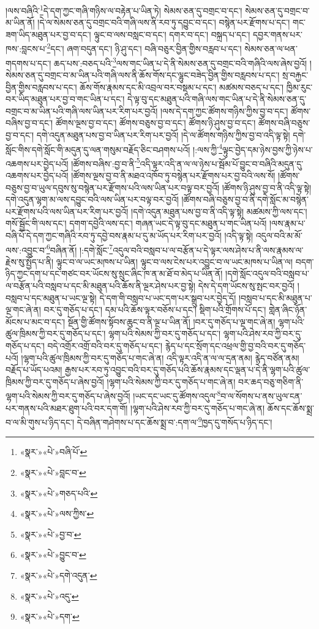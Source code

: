 །ལས་བཞིའི་\footnote{«སྣར་»«པེ་»བཞི་པོ་}དེ་དག་ཀྱང་གཞི་གཉིས་ལ་བརྟེན་པ་ཡིན་ཏེ། སེམས་ཅན་དུ་བགྲང་བ་དང་། སེམས་ཅན་དུ་བགྲང་བ་མ་ཡིན་ནོ། །དེ་ལ་སེམས་ཅན་དུ་བགྲང་བའི་གཞི་ལས་ནི་རབ་ཏུ་དབྱུང་བ་དང་། བསྙེན་པར་རྫོགས་པ་དང་། གང་ཟག་ཡིད་མཐུན་པར་བྱ་བ་དང་། ལྟུང་བ་ལས་བསླང་བ་དང་། དགར་བ་དང་། བསྐྲད་པ་དང་། དབྱར་གནས་པར་ཁས་:བླངས་པ་\footnote{«སྣར་»«པེ་»བླང་བ་}དང་། ཞག་བདུན་དང་། ཉི་ཤུ་དང་། བཞི་བཅུར་བྱིན་གྱིས་བརླབ་པ་དང་། སེམས་ཅན་ལ་ཕན་གདགས་པ་དང་། ཆད་པས་:བཅད་པའི་\footnote{«སྣར་»«པེ་»གཅད་པའི་}ལས་གང་ཡིན་པ་དེ་ནི་སེམས་ཅན་དུ་བགྲང་བའི་གཞིའི་ལས་ཞེས་བྱའོ། །སེམས་ཅན་དུ་བགྲང་བ་མ་ཡིན་པའི་གཞི་ལས་ནི་ཆོས་གོས་དང་ལྷུང་བཟེད་བྱིན་གྱིས་བརླབས་པ་དང་། སྲ་བརྐྱང་བྱིན་གྱིས་བརླབས་པ་དང་། ཆོས་གོས་རྣམས་དང་མི་འབྲལ་བར་བསྡམ་པ་དང་། མཚམས་བཅད་པ་དང་། ཁྱིམ་རུང་བར་ཡིད་མཐུན་པར་བྱ་བ་གང་ཡིན་པ་དང་། དེ་ལྟ་བུ་དང་མཐུན་པའི་གཞི་ལས་གང་ཡིན་པ་དེ་ནི་སེམས་ཅན་དུ་བགྲང་བ་མ་ཡིན་པའི་གཞི་ལས་ཡིན་པར་རིག་པར་བྱའོ། །ལས་དེ་དག་ཀྱང་ཚོགས་གཉིས་ཀྱིས་བྱ་བ་དང་། ཚོགས་བཞིས་བྱ་བ་དང་། ཚོགས་ལྔས་བྱ་བ་དང་། ཚོགས་བཅུས་བྱ་བ་དང་། ཚོགས་ཉི་ཤུས་བྱ་བ་དང་། ཚོགས་བཞི་བཅུས་བྱ་བ་དང་། དགེ་འདུན་མཐུན་པས་བྱ་བ་ཡིན་པར་རིག་པར་བྱའོ། །དེ་ལ་ཚོགས་གཉིས་ཀྱིས་བྱ་བ་འདི་ལྟ་སྟེ། དགེ་སློང་གིས་དགེ་སློང་གི་མདུན་དུ་ལན་གསུམ་བརྗོད་ཅིང་བཤགས་པའོ། །:ལས་ཀྱི་\footnote{«སྣར་»«པེ་»ལས་ཀྱིས་}ལྟུང་བྱེད་དམ་ཉེས་བྱས་ཀྱི་ཉེས་པ་འཆགས་པར་བྱེད་པའོ། །ཚོགས་བཞིས་:བྱ་བ་ནི་\footnote{«སྣར་»«པེ་»བྱ་བ་}འདི་ལྟར་འདི་ན་ལ་ལ་ཉེས་པ་སྦོམ་པོ་བྱུང་བ་བཞིའི་མདུན་དུ་འཆགས་པར་བྱེད་པའོ། །ཚོགས་ལྔས་བྱ་བ་ནི་མཐའ་འཁོབ་ཏུ་བསྙེན་པར་རྫོགས་པར་བྱ་བའི་ལས་སོ། །ཚོགས་བཅུས་བྱ་བ་ཡུལ་དབུས་སུ་བསྙེན་པར་རྫོགས་པའི་ལས་ཡིན་པར་བལྟ་བར་བྱའོ། །ཚོགས་ཉི་ཤུས་བྱ་བ་ནི་འདི་ལྟ་སྟེ། དགེ་འདུན་ལྷག་མ་ལས་དབྱུང་བའི་ལས་ཡིན་པར་བལྟ་བར་བྱའོ། །ཚོགས་བཞི་བཅུས་བྱ་བ་ནི་དགེ་སློང་མ་བསྙེན་པར་རྫོགས་པའི་ལས་ཡིན་པར་རིག་པར་བྱའོ། །དགེ་འདུན་མཐུན་པས་བྱ་བ་ནི་འདི་ལྟ་སྟེ། མཚམས་ཀྱི་ལས་དང་། གསོ་སྦྱོང་གི་ལས་དང་། དགག་དབྱེའི་ལས་དང་། གཞན་ཡང་དེ་ལྟ་བུ་དང་མཐུན་པ་གང་ཡིན་པའོ། །ལས་རྣམ་པ་བཞི་པོ་དེ་དག་ཀྱང་གཞིའི་རབ་ཏུ་དབྱེ་བས་རྣམ་པ་དུ་མ་ཡོད་པར་རིག་པར་བྱའོ། །འདི་ལྟ་སྟེ། འདུལ་བའི་མ་མོ་ལས་:འབྱུང་བ་\footnote{«སྣར་»«པེ་»བྱུང་བ་}བཞིན་ནོ། །:དགེ་སློང་\footnote{«སྣར་»«པེ་»དགེ་འདུན་}འདུལ་བའི་བསླབ་པ་ལ་བརྩོན་པ་དེ་ལྟར་ལས་ཤེས་པ་ནི་ལས་རྣམས་ལ་རྗེས་སུ་སྤྱོད་པ་ནི། ལྟུང་བ་ལ་ཡང་མཁས་པ་ཡིན། ལྟུང་བ་ལས་ངེས་པར་འབྱུང་བ་ལ་ཡང་མཁས་པ་ཡིན་ལ། བདག་ཉིད་ཀྱང་དག་པ་དང་གཙང་བར་ཡོངས་སུ་སྲུང་ཞིང་ཁ་ན་མ་ཐོ་བ་མེད་པ་ཡིན་ནོ། །དགེ་སློང་འདུལ་བའི་བསླབ་པ་ལ་བརྩོན་པའི་བསླབ་པ་དང་མི་མཐུན་པའི་ཆོས་ནི་ལྔར་ཤེས་པར་བྱ་སྟེ། དེས་དེ་དག་ཡོངས་སུ་སྤང་བར་བྱའོ། །བསླབ་པ་དང་མཐུན་པ་ཡང་ལྔ་སྟེ། དེ་དག་གི་བསླབ་པ་ཡང་དག་པར་སྒྲུབ་པར་བྱེད་དོ། །བསླབ་པ་དང་མི་མཐུན་པ་ལྔ་གང་ཞེ་ན། བར་དུ་གཅོད་པ་དང་། དམ་པའི་ཆོས་ལྟར་བཅོས་པ་དང་། སྡིག་པའི་གྲོགས་པོ་དང་། གླེན་ཞིང་ཉོན་མོངས་པ་མང་བ་དང་། སྔོན་གྱི་ཚོགས་སྟོབས་ཆུང་བ་ནི་ལྔ་པ་ཡིན་ནོ། །བར་དུ་གཅོད་པ་ལྔ་གང་ཞེ་ན། ལྷག་པའི་ཚུལ་ཁྲིམས་ཀྱི་བར་དུ་གཅོད་པ་དང་། ལྷག་པའི་སེམས་ཀྱི་བར་དུ་གཅོད་པ་དང་། ལྷག་པའི་ཤེས་རབ་ཀྱི་བར་དུ་གཅོད་པ་དང་། བདེ་འགྲོར་འགྲོ་བའི་བར་དུ་གཅོད་པ་དང་། རྙེད་པ་དང་སྲོག་དང་འཕྲལ་གྱི་བྱ་བའི་བར་དུ་གཅོད་པའོ། །ལྷག་པའི་ཚུལ་ཁྲིམས་ཀྱི་བར་དུ་གཅོད་པ་གང་ཞེ་ན། འདི་ལྟར་འདི་ན་ལ་ལ་དྲན་ནམ། རྙེད་བཙོན་ནམ། བརྗོད་པ་ཡོད་པའམ། རྒྱས་པར་རབ་ཏུ་འབྱུང་བའི་བར་དུ་གཅོད་པའི་ཆོས་རྣམས་དང་ལྡན་པ་དེ་ནི་ལྷག་པའི་ཚུལ་ཁྲིམས་ཀྱི་བར་དུ་གཅོད་པ་ཞེས་བྱའོ། །ལྷག་པའི་སེམས་ཀྱི་བར་དུ་གཅོད་པ་གང་ཞེ་ན། བར་ཆད་བཅུ་གཅིག་ནི་ལྷག་པའི་སེམས་ཀྱི་བར་དུ་གཅོད་པ་ཞེས་བྱའོ། །ཡང་དང་ཡང་དུ་ཚོགས་འདུལ་\footnote{«སྣར་»«པེ་»འདུ་}བ་ལ་སོགས་པ་ནས་ཡུལ་ངན་པར་གནས་པའི་མཐར་ཐུག་པའི་བར་དག་གོ། །ལྷག་པའི་ཤེས་རབ་ཀྱི་བར་དུ་གཅོད་པ་གང་ཞེ་ན། ཆོས་དང་ཆོས་སྨྲ་བ་ལ་མི་གུས་པ་ཉིད་དང་། དེ་བཞིན་གཤེགས་པ་དང་ཆོས་སྨྲ་བ་:དག་ལ་\footnote{«སྣར་»«པེ་»དག་}ཁྱད་དུ་གསོད་པ་ཉིད་དང་། 
